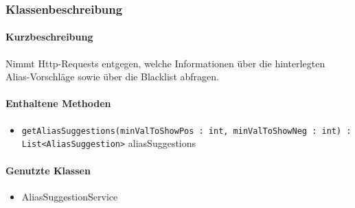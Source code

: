 \subsubsection*{Klassenbeschreibung}%
\paragraph*{Kurzbeschreibung}
Nimmt Http-Requests entgegen, welche Informationen über die hinterlegten Alias-Vorschläge sowie über die Blacklist abfragen.
\paragraph*{Enthaltene Methoden}
\begin{itemize}
    \item \texttt{getAliasSuggestions(minValToShowPos : int, minValToShowNeg : int) : List<AliasSuggestion>} aliasSuggestions
\end{itemize}
\paragraph*{Genutzte Klassen}
\begin{itemize}
    \item AliasSuggestionService
\end{itemize}
